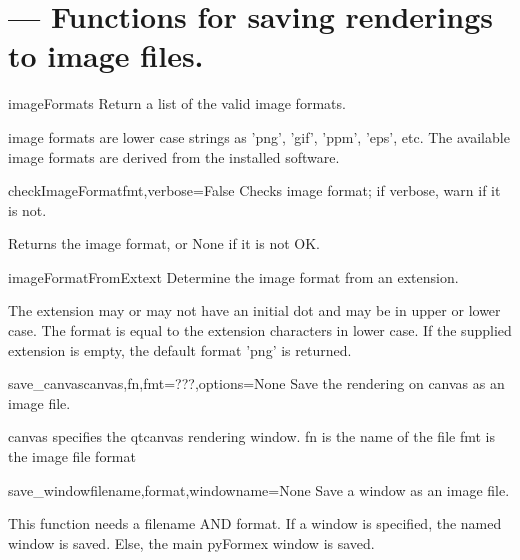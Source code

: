 
\section{ --- Functions for saving renderings to image files.}
\label{sec:image}





\begin{funcdesc}{imageFormats}{}
Return a list of the valid image formats.

    image formats are lower case strings as 'png', 'gif', 'ppm', 'eps', etc.
    The available image formats are derived from the installed software.
    

\end{funcdesc}


\begin{funcdesc}{checkImageFormat}{fmt,verbose=False}
Checks image format; if verbose, warn if it is not.

    Returns the image format, or None if it is not OK.
    

\end{funcdesc}


\begin{funcdesc}{imageFormatFromExt}{ext}
Determine the image format from an extension.

    The extension may or may not have an initial dot and may be in upper or
    lower case. The format is equal to the extension characters in lower case.
    If the supplied extension is empty, the default format 'png' is returned.
    

\end{funcdesc}


\begin{funcdesc}{save_canvas}{canvas,fn,fmt=???,options=None}
Save the rendering on canvas as an image file.

    canvas specifies the qtcanvas rendering window.
    fn is the name of the file
    fmt is the image file format
    

\end{funcdesc}


\begin{funcdesc}{save_window}{filename,format,windowname=None}
Save a window as an image file.

    This function needs a filename AND format.
    If a window is specified, the named window is saved.
    Else, the main pyFormex window is saved.
    

\end{funcdesc}



